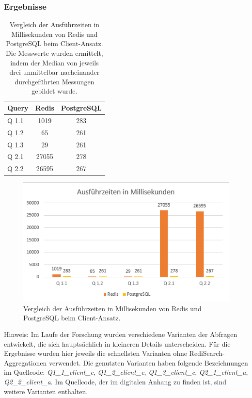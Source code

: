 \subsubsection{Ergebnisse}
\begin{table}[h]
\centering
\begin{tabular}{lcc}
\hline
Query & Redis & PostgreSQL \\ \hline
Q 1.1 & 1019  & 283       \\
Q 1.2 & 65    & 261       \\
Q 1.3 & 29    & 261       \\
Q 2.1 & 27055 & 278       \\
Q 2.2 & 26595 & 267       \\ \hline
\end{tabular}
\caption{Vergleich der Ausführzeiten in Millisekunden von Redis und PostgreSQL beim Client-Ansatz.\\
 Die Messwerte wurden ermittelt, indem der Median von jeweils drei unmittelbar nacheinander durchgeführten Messungen gebildet wurde.}
\label{tab:results-client}
\end{table}
\begin{figure}[ht]  %
    \centering      %
    \includegraphics[width=1\textwidth]{pictures/results/results-client.png}
    \caption{Vergleich der Ausführzeiten in Millisekunden von Redis und PostgreSQL beim Client-Ansatz.}      %
    \label{pic:results-client}    %
\end{figure}

Hinweis: Im Laufe der Forschung wurden verschiedene Varianten der Abfragen entwickelt, die sich hauptsächlich in kleineren Details unterscheiden. Für die Ergebnisse wurden hier jeweils die schnellsten Varianten ohne RediSearch-Aggregationen verwendet. Die genutzten Varianten haben folgende Bezeichnungen im Quellcode: \emph{Q1\_1\_client\_c}, \emph{Q1\_2\_client\_c}, \emph{Q1\_3\_client\_c}, \emph{Q2\_1\_client\_a}, \emph{Q2\_2\_client\_a}. Im Quellcode, der im digitalen Anhang zu finden ist, sind weitere Varianten enthalten. %

